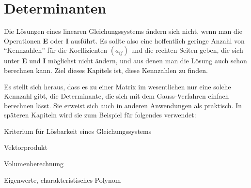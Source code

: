 %
%
%
\chapter{Determinanten\label{chapter-determinanten}}
Die Lösungen eines linearen Gleichungssystems ändern sich nicht,
wenn man die Operationen {\bf E} oder {\bf I} ausführt.
Es sollte
also eine hoffentlich geringe Anzahl von ``Kennzahlen'' für die
Koeffizienten $(a_{ij})$
und die rechten Seiten geben, die sich unter {\bf E} und {\bf I}
möglichst nicht ändern, und aus denen man die Lösung auch
schon berechnen kann.
Ziel dieses Kapitels ist, diese Kennzahlen zu finden.

Es stellt sich heraus, dass es zu einer Matrix
im wesentlichen nur eine solche Kennzahl gibt, die Determinante,
die sich mit dem Gauss-Verfahren einfach berechnen lässt.
Sie erweist sich auch in anderen Anwendungen als praktisch.
In späteren Kapiteln
wird sie zum Beispiel für folgendes verwendet:
\begin{compactitem}
\item Kriterium für Lösbarkeit eines Gleichungssystems
\item Vektorprodukt
\item Volumenberechnung
\item Eigenwerte, charakteristisches Polynom
\end{compactitem}








